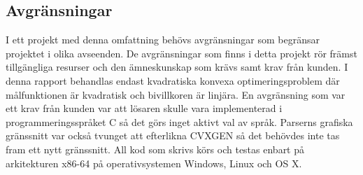 \subsection{Avgränsningar}
I ett projekt med denna omfattning behövs avgränsningar som begränsar projektet i olika avseenden. De avgränsningar som finns i detta projekt rör främst tillgängliga resurser och den ämneskunskap som krävs samt krav från kunden.
\newline
\newline
I denna rapport behandlas endast kvadratiska konvexa optimeringsproblem där målfunktionen är kvadratisk och bivillkoren är linjära. En avgränsning som var ett krav från kunden var att lösaren skulle vara implementerad i programmeringsspråket C så det görs inget aktivt val av språk. Parserns grafiska gränssnitt var också tvunget att efterlikna CVXGEN så det behövdes inte tas fram ett nytt gränssnitt. 
\newline
\newline
All kod som skrivs körs och testas enbart på arkitekturen x86-64 på operativsystemen Windows, Linux och OS X.
